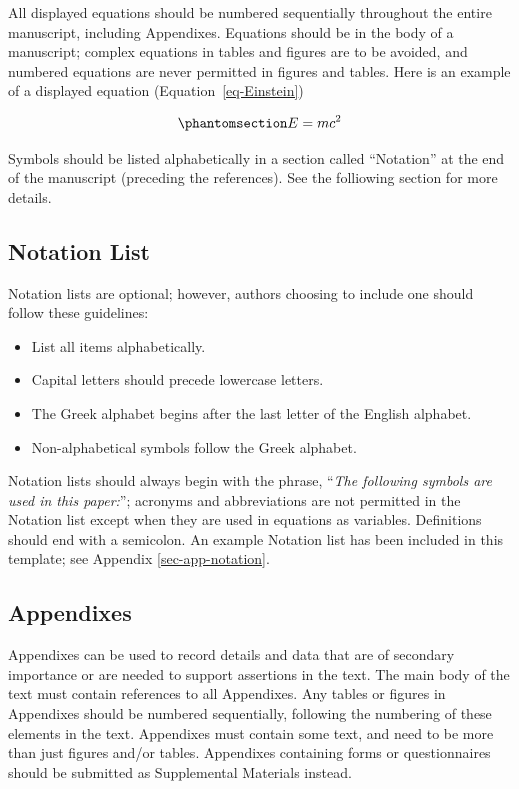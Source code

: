 \documentclass[Journal,LineNumbers]{ascelike-new}
\begin{document}
All displayed equations should be numbered sequentially throughout the
entire manuscript, including Appendixes. Equations should be in the body
of a manuscript; complex equations in tables and figures are to be
avoided, and numbered equations are never permitted in figures and
tables. Here is an example of a displayed equation
(Equation~\ref{eq-Einstein})

\begin{equation}\phantomsection\label{eq-Einstein}{
E = m c^{2}
}\end{equation}

Symbols should be listed alphabetically in a section called ``Notation''
at the end of the manuscript (preceding the references). See the
folliowing section for more details.

\subsection{Notation List}\label{notation-list}

Notation lists are optional; however, authors choosing to include one
should follow these guidelines:

\begin{itemize}
\item
  List all items alphabetically.
\item
  Capital letters should precede lowercase letters.
\item
  The Greek alphabet begins after the last letter of the English
  alphabet.
\item
  Non-alphabetical symbols follow the Greek alphabet.
\end{itemize}

Notation lists should always begin with the phrase, ``\emph{The
following symbols are used in this paper:}''; acronyms and abbreviations
are not permitted in the Notation list except when they are used in
equations as variables. Definitions should end with a semicolon. An
example Notation list has been included in this template; see Appendix
\ref{sec-app-notation}.

\subsection{Appendixes}\label{appendixes}

Appendixes can be used to record details and data that are of secondary
importance or are needed to support assertions in the text. The main
body of the text must contain references to all Appendixes. Any tables
or figures in Appendixes should be numbered sequentially, following the
numbering of these elements in the text. Appendixes must contain some
text, and need to be more than just figures and/or tables. Appendixes
containing forms or questionnaires should be submitted as Supplemental
Materials instead.
\end{document}
